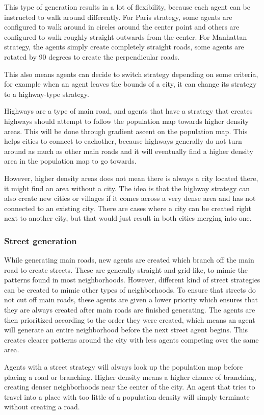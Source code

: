 This type of generation results in a lot of flexibility, because each agent can be instructed to walk around differently.
For Paris strategy, some agents are configured to walk around in circles around the center point and others are configured to walk roughly straight outwards from the center.
For Manhattan strategy, the agents simply create completely straight roads, some agents are rotated by 90 degrees to create the perpendicular roads.

This also means agents can decide to switch strategy depending on some criteria, for example when an agent leaves the bounds of a city, it can change its strategy to a highway-type strategy.

Highways are a type of main road, and agents that have a strategy that creates highways should attempt to follow the population map towards higher density areas.
This will be done through gradient ascent on the population map.
This helps cities to connect to eachother, because highways generally do not turn around as much as other main roads and it will eventually find a higher density area in the population map to go towards.

However, higher density areas does not mean there is always a city located there, it might find an area without a city.
The idea is that the highway strategy can also create new cities or villages if it comes across a very dense area and has not connected to an existing city.
There are cases where a city can be created right next to another city, but that would just result in both cities merging into one.

\subsubsection{Street generation}
While generating main roads, new agents are created which branch off the main road to create streets.
These are generally straight and grid-like, to mimic the patterns found in most neighborhoods.
However, different kind of street strategies can be created to mimic other types of neighborhoods.
To ensure that streets do not cut off main roads, these agents are given a lower priority which ensures that they are always created after main roads are finished generating.
The agents are then prioritized according to the order they were created, which means an agent will generate an entire neighborhood before the next street agent begins.
This creates clearer patterns around the city with less agents competing over the same area.

Agents with a street strategy will always look up the population map before placing a road or branching.
Higher density means a higher chance of branching, creating denser neighborhoods near the center of the city.
An agent that tries to travel into a place with too little of a population density will simply terminate without creating a road. 
